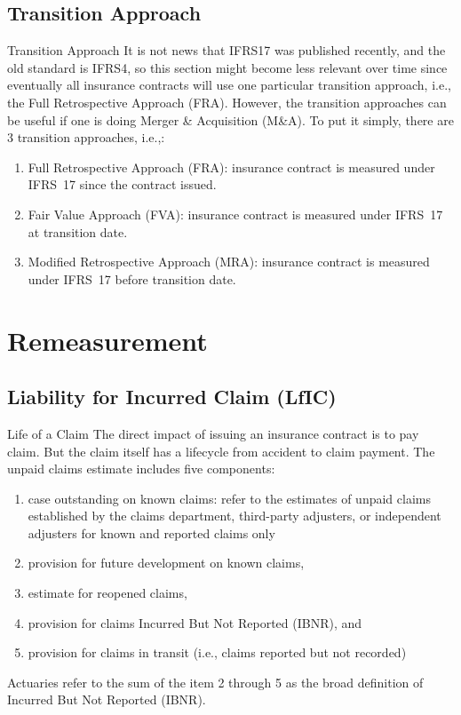 \documentclass[aspectratio=169]{beamer}
\begin{document}
\subsection{Transition Approach}
\begin{frame}{Transition Approach}
It is not news that IFRS17 was published recently, and the old standard is IFRS4, so this section might become less relevant over time since eventually all insurance contracts will use one particular transition approach, i.e., the Full Retrospective Approach (FRA). However, the transition approaches can be useful if one is doing Merger \& Acquisition (M\&A). To put it simply, there are 3 transition approaches, i.e.,:
\begin{enumerate}
	\item Full Retrospective Approach (FRA): insurance contract is measured under IFRS~17 since the contract issued.
	\item Fair Value Approach (FVA): insurance contract is measured under IFRS~17 at transition date.
	\item Modified Retrospective Approach (MRA): insurance contract is measured under IFRS~17 before transition date.
\end{enumerate}
\end{frame}

\section{Remeasurement}
\subsection{Liability for Incurred Claim (LfIC)}
\begin{frame}{Life of a Claim}
The direct impact of issuing an insurance contract is to pay claim. But the claim itself has a lifecycle from accident to claim payment.
The unpaid claims estimate includes five components: 
\begin{enumerate}
	\item case outstanding on known claims: refer to the estimates of unpaid claims established by the claims department, third-party adjusters, or independent adjusters for known and reported claims only 
	\item provision for future development on known claims, 
	\item estimate for reopened claims, 
	\item provision for claims Incurred But Not Reported (IBNR), and 
	\item provision for claims in transit (i.e., claims reported but not recorded)
\end{enumerate}
Actuaries refer to the sum of the item 2 through 5 as the broad definition of Incurred But Not Reported (IBNR). 
\end{frame}
\end{document}
